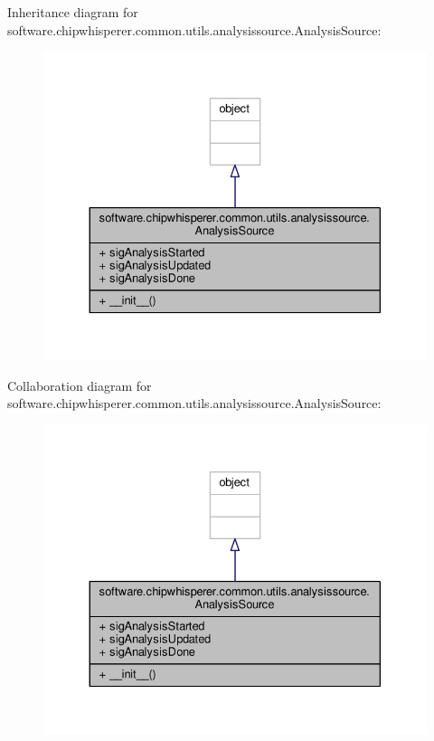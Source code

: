 Inheritance diagram for software.\+chipwhisperer.\+common.\+utils.\+analysissource.\+Analysis\+Source\+:\nopagebreak
\begin{figure}[H]
\begin{center}
\leavevmode
\includegraphics[width=330pt]{d0/da5/classsoftware_1_1chipwhisperer_1_1common_1_1utils_1_1analysissource_1_1AnalysisSource__inherit__graph}
\end{center}
\end{figure}


Collaboration diagram for software.\+chipwhisperer.\+common.\+utils.\+analysissource.\+Analysis\+Source\+:\nopagebreak
\begin{figure}[H]
\begin{center}
\leavevmode
\includegraphics[width=330pt]{da/dd1/classsoftware_1_1chipwhisperer_1_1common_1_1utils_1_1analysissource_1_1AnalysisSource__coll__graph}
\end{center}
\end{figure}


